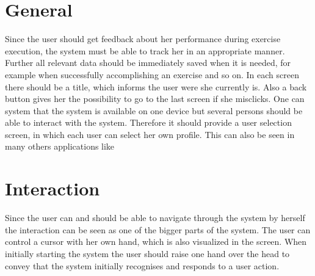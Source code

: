 \section{General}\label{4_2_general}
Since the user should get feedback about her performance during exercise execution, the system must be able to track her in an appropriate manner. Further all relevant data should be immediately saved when it is needed, for example when successfully accomplishing an exercise and so on. %
In each screen there should be a title, which informs the user were she currently is. Also a back button gives her the possibility to go to the last screen if she misclicks. One can system that the system is available on one device but several persons should be able to interact with the system. Therefore it should provide a user selection screen, in which each user can select her own profile. This can also be seen in many others applications like \textbf{\todo{[CITE]}}

\section{Interaction}\label{4_3_interaction}
Since the user can and should be able to navigate through the system by herself the interaction can be seen as one of the bigger parts of the system. The user can control a cursor with her own hand, which is also visualized in the screen. When initially starting the system the user should raise one hand over the head to convey that the system initially recognises and responds to a user action. 

